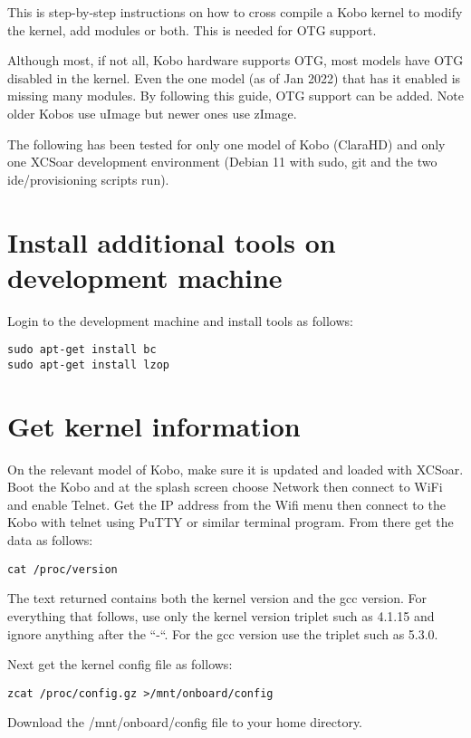 This is step-by-step instructions on how to cross compile a Kobo kernel to modify the
kernel, add modules or both.  This is needed for OTG support.

Although most, if not all, Kobo hardware supports OTG, most models have OTG disabled
in the kernel.  Even the one model (as of Jan 2022) that has it enabled is missing many
modules.  By following this guide, OTG support can be added.  Note older Kobos use 
uImage but newer ones use zImage.

The following has been tested for only one model of Kobo (ClaraHD) and only one XCSoar
development environment (Debian 11 with sudo, git and the two ide/provisioning scripts
run).

\section{Install additional tools on development machine}
Login to the development machine and install tools as follows:

\begin{verbatim}
sudo apt-get install bc
sudo apt-get install lzop
\end{verbatim}

\section{Get kernel information}
On the relevant model of Kobo, make sure it is updated and loaded with XCSoar.  Boot
the Kobo and at the splash screen choose Network then connect to WiFi and enable Telnet.
Get the IP address from the Wifi menu then connect to the Kobo with telnet using PuTTY
or similar terminal program.  From there get the data as follows:

\begin{verbatim}
cat /proc/version
\end{verbatim}

The text returned contains both the kernel version and the gcc version.
For everything that follows, use only the kernel version triplet such as 4.1.15
and ignore anything after the ``-``.  For the gcc version use the triplet such as 5.3.0.

Next get the kernel config file as follows:

\begin{verbatim}
zcat /proc/config.gz >/mnt/onboard/config
\end{verbatim}

Download the /mnt/onboard/config file to your home directory.

